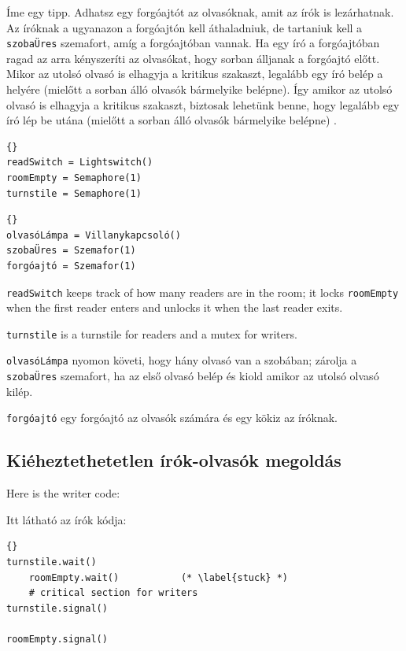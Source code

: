 \documentclass{book}
\newcommand{\clearemptydoublepage}{\newpage\cleardoublepage}
\begin{document}
Íme egy tipp. Adhatsz egy forgóajtót az olvasóknak, amit az írók
is lezárhatnak. Az íróknak a ugyanazon a forgóajtón kell áthaladniuk,
de tartaniuk kell a {\tt szobaÜres} szemafort, amíg a
forgóajtóban vannak. Ha egy író a forgóajtóban ragad az arra kényszeríti
az olvasókat, hogy sorban álljanak a forgóajtó előtt.
Mikor az utolsó olvasó is elhagyja a kritikus szakaszt, legalább egy
író belép a helyére (mielőtt a sorban álló olvasók bármelyike belépne).
Így amikor az utolsó olvasó is elhagyja a kritikus szakaszt,
biztosak lehetünk benne, hogy legalább egy író lép be utána
(mielőtt a sorban álló olvasók bármelyike belépne) .

\begin{lstlisting}[title={No-starve readers-writers initialization}]{}
readSwitch = Lightswitch()
roomEmpty = Semaphore(1)
turnstile = Semaphore(1)
\end{lstlisting}

\begin{lstlisting}[title={Írók-olvasók inicializáció}]{}
olvasóLámpa = Villanykapcsoló()
szobaÜres = Szemafor(1)
forgóajtó = Szemafor(1)
\end{lstlisting}

{\tt readSwitch} keeps track of how many readers are in the room;
it locks {\tt roomEmpty} when the first reader
enters and unlocks it when the last reader exits.

{\tt turnstile} is a turnstile for readers and a 
mutex for writers.

{\tt olvasóLámpa} nyomon követi, hogy hány olvasó van a szobában;
zárolja a {\tt szobaÜres} szemafort, ha az első olvasó belép és
kiold amikor az utolsó olvasó kilép.

{\tt forgóajtó} egy forgóajtó az olvasók számára és egy kökiz az íróknak.

\clearemptydoublepage
\subsection{Kiéheztethetetlen írók-olvasók megoldás}  

Here is the writer code:

Itt látható az írók kódja:

\begin{lstlisting}[title={No-starve writer solution}]{}
turnstile.wait()
    roomEmpty.wait()           (* \label{stuck} *)
    # critical section for writers
turnstile.signal()

roomEmpty.signal()
\end{lstlisting}
\end{document}
